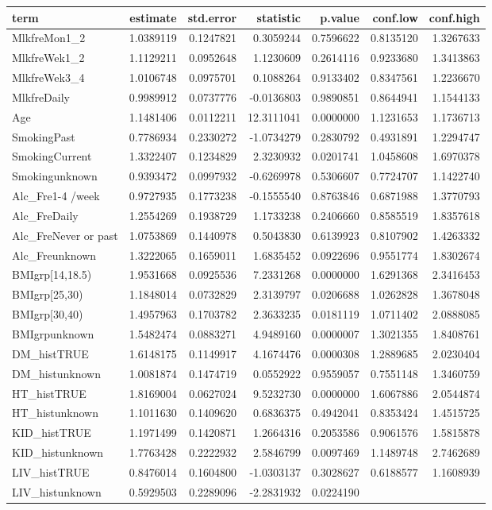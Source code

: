 \documentclass[]{article}
\begin{document}
\begin{longtable}[]{@{}lrrrrrr@{}}
\toprule
term & estimate & std.error & statistic & p.value & conf.low &
conf.high\tabularnewline
\midrule
\endhead
MlkfreMon1\_2 & 1.0389119 & 0.1247821 & 0.3059244 & 0.7596622 &
0.8135120 & 1.3267633\tabularnewline
MlkfreWek1\_2 & 1.1129211 & 0.0952648 & 1.1230609 & 0.2614116 &
0.9233680 & 1.3413863\tabularnewline
MlkfreWek3\_4 & 1.0106748 & 0.0975701 & 0.1088264 & 0.9133402 &
0.8347561 & 1.2236670\tabularnewline
MlkfreDaily & 0.9989912 & 0.0737776 & -0.0136803 & 0.9890851 & 0.8644941
& 1.1544133\tabularnewline
Age & 1.1481406 & 0.0112211 & 12.3111041 & 0.0000000 & 1.1231653 &
1.1736713\tabularnewline
SmokingPast & 0.7786934 & 0.2330272 & -1.0734279 & 0.2830792 & 0.4931891
& 1.2294747\tabularnewline
SmokingCurrent & 1.3322407 & 0.1234829 & 2.3230932 & 0.0201741 &
1.0458608 & 1.6970378\tabularnewline
Smokingunknown & 0.9393472 & 0.0997932 & -0.6269978 & 0.5306607 &
0.7724707 & 1.1422740\tabularnewline
Alc\_Fre1-4 /week & 0.9727935 & 0.1773238 & -0.1555540 & 0.8763846 &
0.6871988 & 1.3770793\tabularnewline
Alc\_FreDaily & 1.2554269 & 0.1938729 & 1.1733238 & 0.2406660 &
0.8585519 & 1.8357618\tabularnewline
Alc\_FreNever or past & 1.0753869 & 0.1440978 & 0.5043830 & 0.6139923 &
0.8107902 & 1.4263332\tabularnewline
Alc\_Freunknown & 1.3222065 & 0.1659011 & 1.6835452 & 0.0922696 &
0.9551774 & 1.8302674\tabularnewline
BMIgrp{[}14,18.5) & 1.9531668 & 0.0925536 & 7.2331268 & 0.0000000 &
1.6291368 & 2.3416453\tabularnewline
BMIgrp{[}25,30) & 1.1848014 & 0.0732829 & 2.3139797 & 0.0206688 &
1.0262828 & 1.3678048\tabularnewline
BMIgrp{[}30,40) & 1.4957963 & 0.1703782 & 2.3633235 & 0.0181119 &
1.0711402 & 2.0888085\tabularnewline
BMIgrpunknown & 1.5482474 & 0.0883271 & 4.9489160 & 0.0000007 &
1.3021355 & 1.8408761\tabularnewline
DM\_histTRUE & 1.6148175 & 0.1149917 & 4.1674476 & 0.0000308 & 1.2889685
& 2.0230404\tabularnewline
DM\_histunknown & 1.0081874 & 0.1474719 & 0.0552922 & 0.9559057 &
0.7551148 & 1.3460759\tabularnewline
HT\_histTRUE & 1.8169004 & 0.0627024 & 9.5232730 & 0.0000000 & 1.6067886
& 2.0544874\tabularnewline
HT\_histunknown & 1.1011630 & 0.1409620 & 0.6836375 & 0.4942041 &
0.8353424 & 1.4515725\tabularnewline
KID\_histTRUE & 1.1971499 & 0.1420871 & 1.2664316 & 0.2053586 &
0.9061576 & 1.5815878\tabularnewline
KID\_histunknown & 1.7763428 & 0.2222932 & 2.5846799 & 0.0097469 &
1.1489748 & 2.7462689\tabularnewline
LIV\_histTRUE & 0.8476014 & 0.1604800 & -1.0303137 & 0.3028627 &
0.6188577 & 1.1608939\tabularnewline
LIV\_histunknown & 0.5929503 & 0.2289096 & -2.2831932 & 0.0224190 &

\end{longtable}
\end{document}
